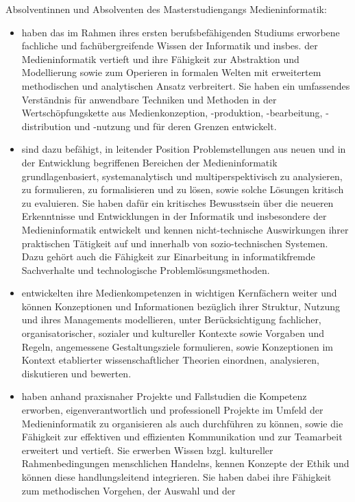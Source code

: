 Absolventinnen und Absolventen des Masterstudiengangs Medieninformatik:

\begin{itemize}
\tightlist
\item
  haben das im Rahmen ihres ersten berufsbefähigenden Studiums erworbene
  fachliche und fachübergreifende Wissen der Informatik und insbes. der
  Medieninformatik vertieft und ihre Fähigkeit zur Abstraktion und
  Modellierung sowie zum Operieren in formalen Welten mit erweitertem
  methodischen und analytischen Ansatz verbreitert. Sie haben ein
  umfassendes Verständnis für anwendbare Techniken und Methoden in der
  Wertschöpfungskette aus Medienkonzeption, -produktion, -bearbeitung,
  -distribution und -nutzung und für deren Grenzen entwickelt.
\item
  sind dazu befähigt, in leitender Position Problemstellungen aus neuen
  und in der Entwicklung begriffenen Bereichen der Medieninformatik
  grundlagenbasiert, systemanalytisch und multiperspektivisch zu
  analysieren, zu formulieren, zu formalisieren und zu lösen, sowie
  solche Lösungen kritisch zu evaluieren. Sie haben dafür ein kritisches
  Bewusstsein über die neueren Erkenntnisse und Entwicklungen in der
  Informatik und insbesondere der Medieninformatik entwickelt und kennen
  nicht-technische Auswirkungen ihrer praktischen Tätigkeit auf und
  innerhalb von sozio-technischen Systemen. Dazu gehört auch die
  Fähigkeit zur Einarbeitung in informatikfremde Sachverhalte und
  technologische Problemlösungsmethoden.
\item
  entwickelten ihre Medienkompetenzen in wichtigen Kernfächern weiter
  und können Konzeptionen und Informationen bezüglich ihrer Struktur,
  Nutzung und ihres Managements modellieren, unter Berücksichtigung
  fachlicher, organisatorischer, sozialer und kultureller Kontexte sowie
  Vorgaben und Regeln, angemessene Gestaltungsziele formulieren, sowie
  Konzeptionen im Kontext etablierter wissenschaftlicher Theorien
  einordnen, analysieren, diskutieren und bewerten.
\item
  haben anhand praxisnaher Projekte und Fallstudien die Kompetenz
  erworben, eigenverantwortlich und professionell Projekte im Umfeld der
  Medieninformatik zu organisieren als auch durchführen zu können, sowie
  die Fähigkeit zur effektiven und effizienten Kommunikation und zur
  Teamarbeit erweitert und vertieft. Sie erwerben Wissen bzgl.
  kultureller Rahmenbedingungen menschlichen Handelns, kennen Konzepte
  der Ethik und können diese handlungsleitend integrieren. Sie haben
  dabei ihre Fähigkeit zum methodischen Vorgehen, der Auswahl und der

\end{itemize}

